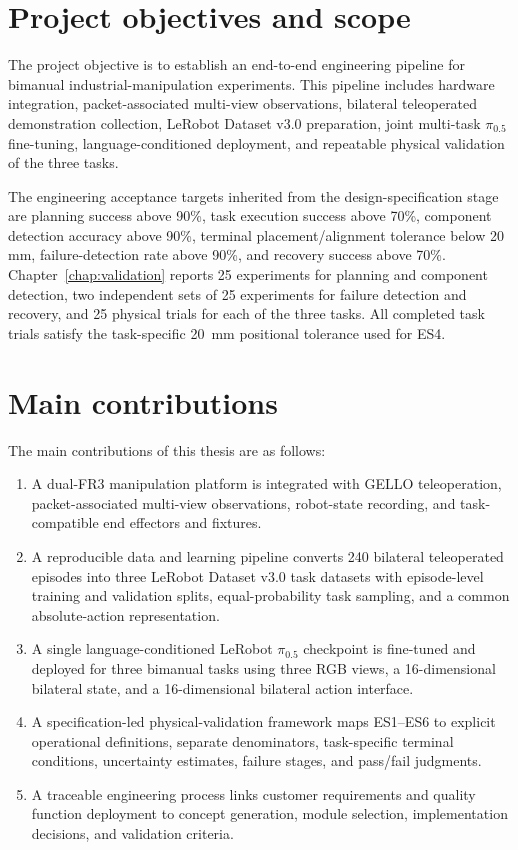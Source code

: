 \section{Project objectives and scope}

The project objective is to establish an end-to-end engineering pipeline for bimanual industrial-manipulation experiments. This pipeline includes hardware integration, packet-associated multi-view observations, bilateral teleoperated demonstration collection, LeRobot Dataset v3.0 preparation, joint multi-task $\pi_{0.5}$ fine-tuning, language-conditioned deployment, and repeatable physical validation of the three tasks.

The engineering acceptance targets inherited from the design-specification stage are planning success above 90\%, task execution success above 70\%, component detection accuracy above 90\%, terminal placement/alignment tolerance below 20\,mm, failure-detection rate above 90\%, and recovery success above 70\%. Chapter~\ref{chap:validation} reports 25 experiments for planning and component detection, two independent sets of 25 experiments for failure detection and recovery, and 25 physical trials for each of the three tasks. All completed task trials satisfy the task-specific 20~mm positional tolerance used for ES4.

\section{Main contributions}

The main contributions of this thesis are as follows:

\begin{enumerate}
  \item A dual-FR3 manipulation platform is integrated with GELLO teleoperation, packet-associated multi-view observations, robot-state recording, and task-compatible end effectors and fixtures.
  \item A reproducible data and learning pipeline converts 240 bilateral teleoperated episodes into three LeRobot Dataset v3.0 task datasets with episode-level training and validation splits, equal-probability task sampling, and a common absolute-action representation.
  \item A single language-conditioned LeRobot $\pi_{0.5}$ checkpoint is fine-tuned and deployed for three bimanual tasks using three RGB views, a 16-dimensional bilateral state, and a 16-dimensional bilateral action interface.
  \item A specification-led physical-validation framework maps ES1--ES6 to explicit operational definitions, separate denominators, task-specific terminal conditions, uncertainty estimates, failure stages, and pass/fail judgments.
  \item A traceable engineering process links customer requirements and quality function deployment to concept generation, module selection, implementation decisions, and validation criteria.
\end{enumerate}

